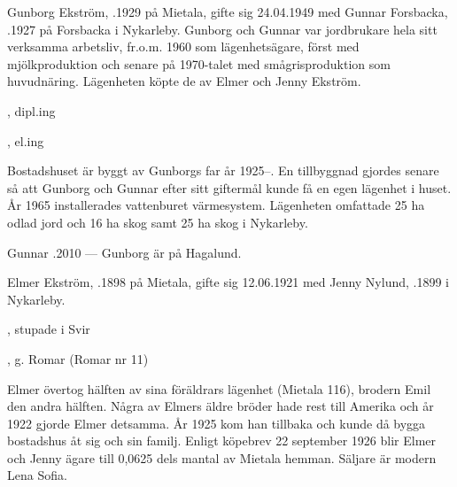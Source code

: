 %
Gunborg Ekström, .1929 på Mietala, gifte sig 24.04.1949 med Gunnar Forsbacka, .1927 på Forsbacka i Nykarleby. Gunborg och Gunnar var jordbrukare hela sitt verksamma arbetsliv, fr.o.m. 1960 som lägenhetsägare, först med mjölkproduktion och senare på 1970-talet med smågrisproduktion som huvudnäring. Lägenheten köpte de av Elmer och Jenny Ekström.
\begin{jhchildren}
  \item {}, dipl.ing
  \item {}, el.ing
\end{jhchildren}

Bostadshuset är byggt av Gunborgs far år 1925--. En tillbyggnad gjordes senare så att Gunborg och Gunnar efter sitt
giftermål kunde få en egen lägenhet i huset. År 1965 installerades vattenburet värmesystem. Lägenheten omfattade 25 ha odlad jord och 16 ha skog samt 25 ha skog i Nykarleby.

Gunnar .2010  ---  Gunborg är på Hagalund.


%
Elmer Ekström, .1898 på Mietala, gifte sig 12.06.1921 med Jenny Nylund, .1899 i Nykarleby.
\begin{jhchildren}
  \item {}, stupade i Svir
  \item {}
  \item {}, g. Romar (Romar nr 11)
\end{jhchildren}

Elmer övertog hälften av sina föräldrars lägenhet (Mietala 116), brodern Emil den andra hälften. Några av Elmers äldre bröder hade rest till  Amerika och år 1922 gjorde Elmer detsamma. År 1925 kom han tillbaka och kunde då bygga bostadshus åt sig och sin familj. Enligt köpebrev 22 september 1926 blir Elmer och Jenny ägare till 0,0625 dels mantal av Mietala hemman. Säljare är modern Lena Sofia.

